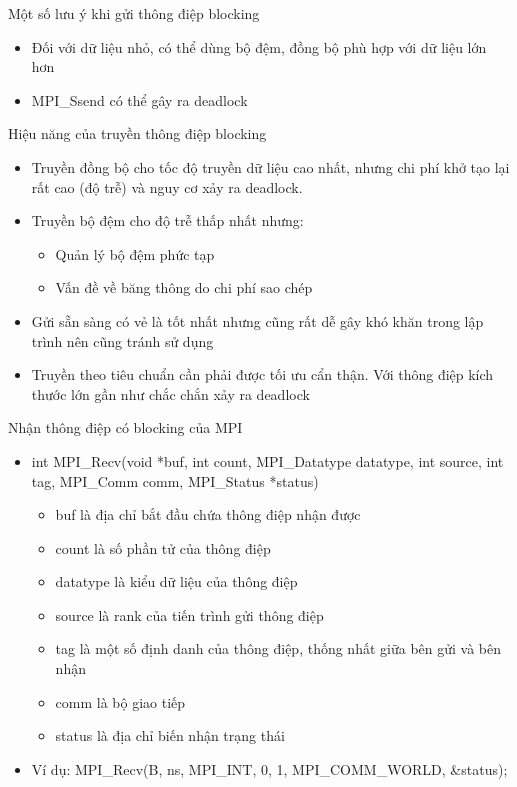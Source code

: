 \documentclass[10pt]{beamer}
\theoremstyle{remark}
\numberwithin{algocf}{section}
\numberwithin{equation}{section}
\numberwithin{dl}{section}
\numberwithin{figure}{section}
\begin{document}
\begin{frame}{Một số lưu ý khi gửi thông điệp blocking}
    \begin{itemize}
        \item Đối với dữ liệu nhỏ, có thể dùng bộ đệm, đồng bộ phù hợp với dữ liệu lớn hơn
        \item MPI\_Ssend có thể gây ra deadlock
    \end{itemize}
\end{frame}

\begin{frame}{Hiệu năng của truyền thông điệp blocking}
    \begin{itemize}
        \item Truyền đồng bộ  cho tốc độ truyền dữ liệu cao nhất, nhưng chi phí khở tạo lại rất cao (độ trễ) và nguy cơ xảy ra deadlock.
        \item Truyền bộ đệm cho độ trễ thấp nhất nhưng:
        \begin{itemize}
            \item Quản lý bộ đệm phức tạp
            \item Vấn đề về băng thông do chi phí sao chép
        \end{itemize}
        \item Gửi sẵn sàng có vẻ là tốt nhất nhưng cũng rất dễ gây khó khăn trong lập trình nên cũng tránh sử dụng
        \item Truyền theo tiêu chuẩn cần phải được tối ưu cẩn thận. Với thông điệp kích thước lớn gần như chắc chắn xảy ra deadlock
    \end{itemize}
    
\end{frame}

\begin{frame}{Nhận thông điệp có blocking của MPI}
    \begin{itemize}
        \item int MPI\_Recv(void *buf, int count, MPI\_Datatype datatype,
                            int source, int tag, MPI\_Comm comm,
                            MPI\_Status *status)
        \begin{itemize}
            \item buf là địa chỉ bắt đầu chứa thông điệp nhận được
            \item count là số phần tử của thông điệp
            \item datatype là kiểu dữ liệu của thông điệp
            \item source là rank của tiến trình gửi thông điệp
            \item tag là một số định danh của thông điệp, thống nhất giữa bên gửi và bên nhận
            \item comm là bộ giao tiếp
            \item status là địa chỉ biến nhận trạng thái
        \end{itemize}
        \item Ví dụ: MPI\_Recv(B, ns, MPI\_INT, 0, 1, MPI\_COMM\_WORLD, \&status);
    \end{itemize}
\end{frame}
\end{document}
